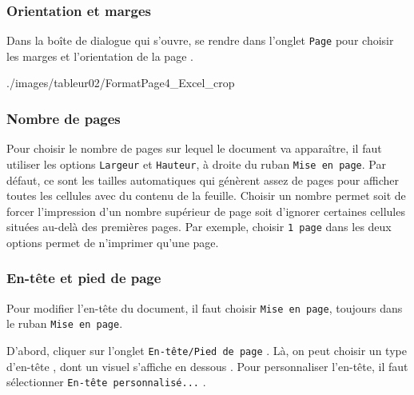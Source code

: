 


\subsubsection{Orientation et marges}  

Dans la boîte de dialogue qui s'ouvre, se rendre dans l'onglet \texttt{Page} pour choisir les marges  et l'orientation de la page .

%
                {./images/tableur02/FormatPage4_Excel_crop}{\textwidth}  


\subsubsection{Nombre de pages}

Pour choisir le nombre de pages sur lequel le document va apparaître, il faut utiliser les options \texttt{Largeur} et \texttt{Hauteur}, à droite du ruban \texttt{Mise en page}. Par défaut, ce sont les tailles automatiques qui génèrent assez de pages pour afficher toutes les cellules avec du contenu de la feuille. Choisir un nombre permet soit de forcer l'impression d'un nombre supérieur de page soit d'ignorer certaines cellules situées au-delà des premières pages. Par exemple, choisir \texttt{1 page} dans les deux options permet de n'imprimer qu'une page.




\subsubsection{En-tête et pied de page}

Pour modifier l'en-tête du document, il faut choisir \texttt{Mise en page}, toujours dans le ruban \texttt{Mise en page}.

D'abord, cliquer sur l'onglet \texttt{En-tête/Pied de page} . Là, on peut choisir un type d'en-tête , dont un visuel s'affiche en dessous . Pour personnaliser l'en-tête, il faut sélectionner \texttt{En-tête personnalisé...} .


